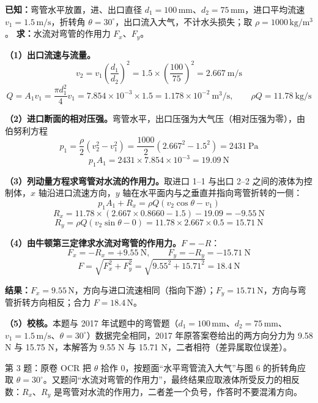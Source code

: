 
\begin{jie}
\textbf{已知：}弯管水平放置，进、出口直径 $d_1=100\,\mathrm{mm}$、$d_2=75\,\mathrm{mm}$，进口平均流速 $v_1=1.5\,\mathrm{m/s}$，折转角 $\theta=30^\circ$，出口流入大气，不计水头损失；取 $\rho=1000\,\mathrm{kg/m^3}$。
\textbf{求：}水流对弯管的作用力 $F_x$、$F_y$。

\textbf{（1）出口流速与流量。}
\[
v_2=v_1\left(\frac{d_1}{d_2}\right)^2=1.5\times\left(\frac{100}{75}\right)^2=2.667\ \mathrm{m/s}
\]
\[
Q=A_1v_1=\frac{\pi d_1^2}{4}v_1=7.854\times10^{-3}\times1.5=1.178\times10^{-2}\ \mathrm{m^3/s},\qquad \rho Q=11.78\ \mathrm{kg/s}
\]

\textbf{（2）进口断面的相对压强。}弯管水平，出口压强为大气压（相对压强为零），由伯努利方程
\[
p_1=\frac{\rho}{2}\left(v_2^2-v_1^2\right)=\frac{1000}{2}\left(2.667^2-1.5^2\right)=2431\ \mathrm{Pa}
\]
\[
p_1A_1=2431\times7.854\times10^{-3}=19.09\ \mathrm{N}
\]

\textbf{（3）列动量方程求弯管对水流的作用力。}取进口 1--1 与出口 2--2 之间的液体为控制体，$x$ 轴沿进口流速方向，$y$ 轴在水平面内与之垂直并指向弯管折转的一侧：
\[
p_1A_1+R_x=\rho Q\left(v_2\cos\theta-v_1\right)
\]
\[
R_x=11.78\times\left(2.667\times0.8660-1.5\right)-19.09=-9.55\ \mathrm{N}
\]
\[
R_y=\rho Q\left(v_2\sin\theta-0\right)=11.78\times2.667\times0.5=15.71\ \mathrm{N}
\]

\textbf{（4）由牛顿第三定律求水流对弯管的作用力。}$F=-R$：
\[
F_x=-R_x=+9.55\ \mathrm{N},\qquad F_y=-R_y=-15.71\ \mathrm{N}
\]
\[
F=\sqrt{F_x^2+F_y^2}=\sqrt{9.55^2+15.71^2}=18.4\ \mathrm{N}
\]

\textbf{结果：}$F_x=9.55\,\mathrm{N}$，方向与进口流速相同（指向下游）；$F_y=15.71\,\mathrm{N}$，方向与弯管折转方向相反；合力 $F=18.4\,\mathrm{N}$。

\textbf{（5）校核。}本题与 2017 年试题中的弯管题（$d_1=100\,\mathrm{mm}$、$d_2=75\,\mathrm{mm}$、$v_1=1.5\,\mathrm{m/s}$、$\theta=30^\circ$）数据完全相同，2017 年原答案卷给出的两方向分力为 9.58 N 与 15.75 N，本解答为 9.55 N 与 15.71 N，二者相符（差异属取位误差）。
\end{jie}

\begin{tishi}
第 3 题：原卷 OCR 把 $\theta$ 拾作 0，按题面“水平弯管流入大气”与图 6 的折转角应取 $\theta=30^\circ$。又题问“水流对弯管的作用力”，最终结果应取液体所受反力的相反数：$R_x$、$R_y$ 是弯管对水流的作用力，二者差一个负号，作答时不要混淆方向。
\end{tishi}

